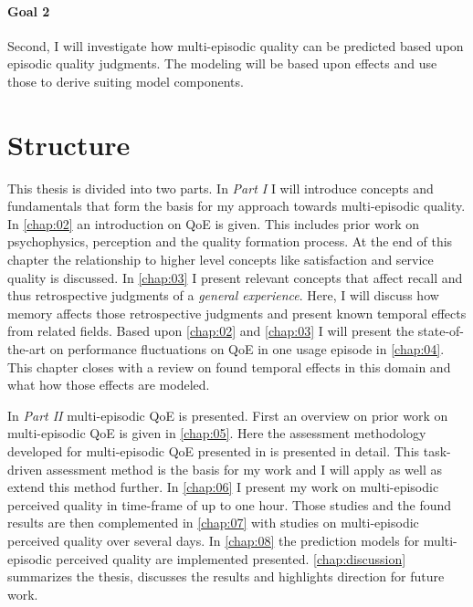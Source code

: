 \paragraph*{Goal 2}
Second, I will investigate how multi-episodic quality can be predicted based upon episodic quality judgments.
The modeling will be based upon effects and use those to derive suiting model components.

\section{Structure}
This thesis is divided into two parts.
In \emph{Part I} I will introduce concepts and fundamentals that form the basis for my approach towards multi-episodic quality.
In \autoref{chap:02} an introduction on \ac{QoE} is given.
This includes prior work on psychophysics, perception and the quality formation process.
At the end of this chapter the relationship to higher level concepts like satisfaction and service quality is discussed.
In \autoref{chap:03} I present relevant concepts that affect recall and thus retrospective judgments of a \emph{general experience}.
Here, I will discuss how memory affects those retrospective judgments and present known temporal effects from related fields.
Based upon \autoref{chap:02} and \autoref{chap:03} I will present the state-of-the-art on performance fluctuations on QoE in one usage episode in \autoref{chap:04}.
This chapter closes with a review on found temporal effects in this domain and what how those effects are modeled.

In \emph{Part II} multi-episodic QoE is presented.
First an overview on prior work on multi-episodic QoE is given in \autoref{chap:05}.
Here the assessment methodology developed for multi-episodic QoE presented in \cite{moller_single-call_2011} is presented in detail.
This task-driven assessment method is the basis for my work and I will apply as well as extend this method further.
In \autoref{chap:06} I present my work on multi-episodic perceived quality in time-frame of up to one hour.
Those studies and the found results are then complemented in \autoref{chap:07} with studies on multi-episodic perceived quality over several days.
In \autoref{chap:08} the prediction models for multi-episodic perceived quality are implemented presented.
\autoref{chap:discussion} summarizes the thesis, discusses the results and highlights direction for future work.
